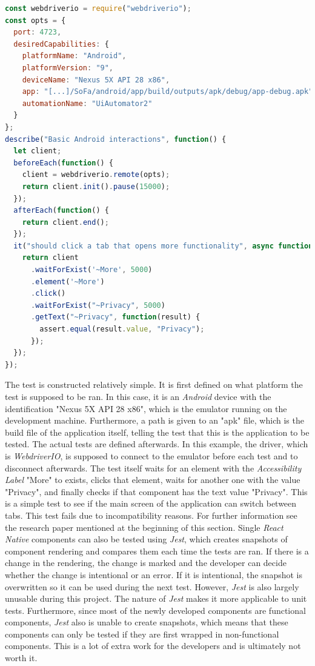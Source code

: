 \begin{lstlisting}[language=javascript, caption=\textit{Appium} end-to-end test, label=lst:appium_test]
const webdriverio = require("webdriverio");
const opts = {
  port: 4723,
  desiredCapabilities: {
    platformName: "Android",
    platformVersion: "9",
    deviceName: "Nexus 5X API 28 x86",
    app: "[...]/SoFa/android/app/build/outputs/apk/debug/app-debug.apk",
    automationName: "UiAutomator2"
  }
};
describe("Basic Android interactions", function() {
  let client;
  beforeEach(function() {
    client = webdriverio.remote(opts);
    return client.init().pause(15000);
  });
  afterEach(function() {
    return client.end();
  });
  it("should click a tab that opens more functionality", async function() {
    return client
      .waitForExist('~More', 5000)
      .element('~More')
      .click()
      .waitForExist("~Privacy", 5000)
      .getText("~Privacy", function(result) {
        assert.equal(result.value, "Privacy");
      });
  });
});
\end{lstlisting}

The test is constructed relatively simple. It is first defined on what platform the test is supposed to be ran. In this case, it is an \textit{Android} device with the identification "Nexus 5X API 28 x86", which is the emulator running on the development machine. Furthermore, a path is given to an "apk" file, which is the build file of the application itself, telling the test that this is the application to be tested.
\newline
The actual tests are defined afterwards. In this example, the driver, which is \textit{WebdriverIO}, is supposed to connect to the emulator before each test and to disconnect afterwards. The test itself waits for an element with the \textit{Accessibility Label} "More" to exists, clicks that element, waits for another one with the value "Privacy", and finally checks if that component has the text value "Privacy". This is a simple test to see if the main screen of the application can switch between tabs. This test fails due to incompatibility reasons. For further information see the research paper mentioned at the beginning of this section.
\newline
Single \textit{React Native} components can also be tested using \textit{Jest}, which creates snapshots of component rendering and compares them each time the tests are ran. If there is a change in the rendering, the change is marked and the developer can decide whether the change is intentional or an error. If it is intentional, the snapshot is overwritten so it can be used during the next test.
\newline
However, \textit{Jest} is also largely unusable during this project. The nature of \textit{Jest} makes it more applicable to unit tests. Furthermore, since most of the newly developed components are functional components, \textit{Jest} also is unable to create snapshots, which means that these components can only be tested if they are first wrapped in non-functional components. This is a lot of extra work for the developers and is ultimately not worth it.